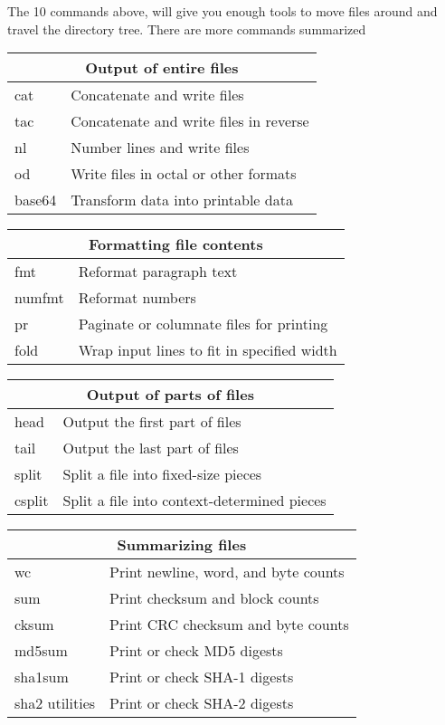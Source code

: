 The 10 commands above, will give you enough tools to move files around and travel the directory tree. There are more commands summarized 

\begin{tabularx}{0.75\textwidth}{|l|X|}
\hline
\multicolumn{2}{|c|}{Output of entire files}\\ \hline
cat  &                Concatenate and write files\\
tac  &                Concatenate and write files in reverse\\
nl  &                 Number lines and write files\\
od  &                 Write files in octal or other formats\\
base64  &             Transform data into printable data\\
\hline
\end{tabularx}

\begin{tabularx}{0.75\textwidth}{|l|X|}
\hline
\multicolumn{2}{|c|}{Formatting file contents}\\ \hline
fmt  &                Reformat paragraph text\\
numfmt  &             Reformat numbers\\
pr  &                 Paginate or columnate files for printing\\
fold  &               Wrap input lines to fit in specified width\\
\hline
\end{tabularx}

\begin{tabularx}{0.75\textwidth}{|l|X|}
\hline
\multicolumn{2}{|c|}{Output of parts of files}\\ \hline
head  &               Output the first part of files\\
tail  &               Output the last part of files\\
split  &              Split a file into fixed-size pieces\\
csplit  &             Split a file into context-determined pieces\\
\hline
\end{tabularx}

\begin{tabularx}{0.75\textwidth}{|l|X|}
\hline
\multicolumn{2}{|c|}{Summarizing files}\\ \hline
wc  &                 Print newline, word, and byte counts\\
sum  &                Print checksum and block counts\\
cksum  &              Print CRC checksum and byte counts\\
md5sum  &             Print or check MD5 digests\\
sha1sum  &            Print or check SHA-1 digests\\
sha2 utilities &                Print or check SHA-2 digests\\
\hline
\end{tabularx}

